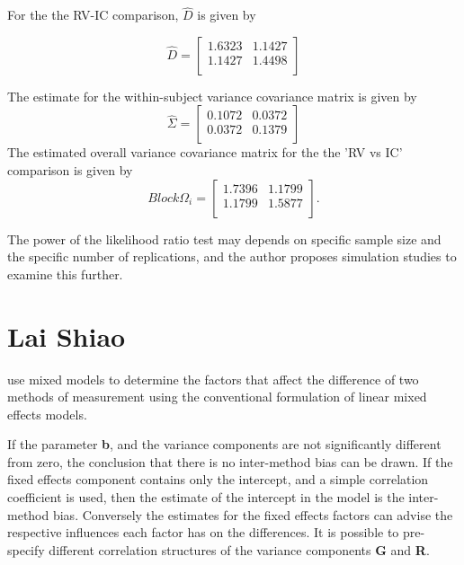 \documentclass[12pt, a4paper]{report}
\begin{document}
For the the RV-IC comparison, $\hat{D}$ is given by


\begin{equation}
\hat{D}= \left[ \begin{array}{cc}
  1.6323 & 1.1427  \\
  1.1427 & 1.4498 \\
\end{array} \right]
\end{equation}

The estimate for the within-subject variance covariance matrix is
given by
\begin{equation}
\hat{\Sigma}= \left[ \begin{array}{cc}
  0.1072 & 0.0372  \\
  0.0372 & 0.1379  \\
\end{array}\right]
\end{equation}
The estimated overall variance covariance matrix for the the 'RV
vs IC' comparison is given by
\begin{equation}
Block \Omega_{i}= \left[ \begin{array}{cc}
  1.7396 & 1.1799  \\
  1.1799 & 1.5877  \\
\end{array} \right].
\end{equation}

 The power of the
likelihood ratio test may depends on specific sample size and the
specific number of  replications, and the author proposes
simulation studies to examine this further.



\newpage
\section{Lai Shiao}
\citet{LaiShiao} use mixed models to determine the factors that
affect the difference of two methods of measurement using the
conventional formulation of linear mixed effects models.

If the parameter \textbf{b}, and the variance components are not
significantly different from zero, the conclusion that there is no
inter-method bias can be drawn. If the fixed effects component
contains only the intercept, and a simple correlation coefficient
is used, then the estimate of the intercept in the model is the
inter-method bias. Conversely the estimates for the fixed effects
factors can advise the respective influences each factor has on
the differences. It is possible to pre-specify different
correlation structures of the variance components \textbf{G} and
\textbf{R}.
\end{document}
